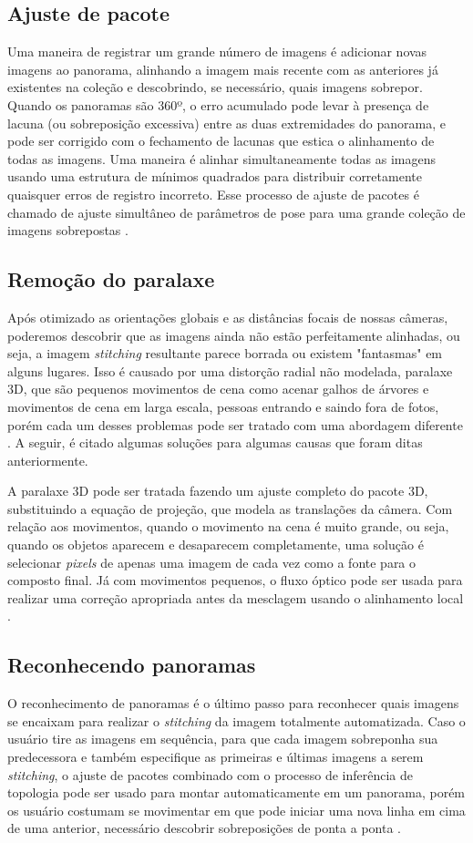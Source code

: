 \documentclass{article}
\begin{document}
\subsection{Ajuste de pacote}
Uma maneira de registrar um grande número de imagens é adicionar novas imagens ao panorama, alinhando a imagem mais recente com as anteriores já existentes na coleção e descobrindo, se necessário, quais imagens sobrepor. Quando os panoramas são 360º, o erro acumulado pode levar à presença de lacuna (ou sobreposição excessiva) entre as duas extremidades do panorama, e pode ser corrigido com o fechamento de lacunas que estica o alinhamento de todas as imagens. Uma maneira é alinhar simultaneamente todas as imagens usando uma estrutura de mínimos quadrados para distribuir corretamente quaisquer erros de registro incorreto. Esse processo de ajuste de pacotes é chamado de ajuste simultâneo de parâmetros de pose para uma grande coleção de imagens sobrepostas \cite{szeliski:2010}. 

\subsection{Remoção do paralaxe}
Após otimizado as orientações globais e as distâncias focais de nossas câmeras, poderemos descobrir que as imagens ainda não estão perfeitamente alinhadas, ou seja, a imagem \textit{stitching} resultante parece borrada ou existem "fantasmas" em alguns lugares. Isso é causado por uma distorção radial não modelada, paralaxe 3D, que são pequenos movimentos de cena como acenar galhos de árvores e movimentos de cena em larga escala, pessoas entrando e saindo fora de fotos, porém cada um desses problemas pode ser tratado com uma abordagem diferente \cite{szeliski:2010}. A seguir, é citado algumas soluções para algumas causas que foram ditas anteriormente.

A paralaxe 3D pode ser tratada fazendo um ajuste completo do pacote 3D, substituindo a equação de projeção, que modela as translações da câmera. Com relação aos movimentos, quando o movimento na cena é muito grande, ou seja, quando os objetos aparecem e desaparecem completamente, uma solução é selecionar \textit{pixels} de apenas uma imagem de cada vez como a fonte para o composto final. Já com movimentos pequenos, o fluxo óptico pode ser usada para realizar uma correção apropriada antes da mesclagem usando o alinhamento local \cite{szeliski:2010}.

\subsection{Reconhecendo panoramas}
O reconhecimento de panoramas é o último passo para reconhecer quais imagens se encaixam para realizar o \textit{stitching} da imagem totalmente automatizada. Caso o usuário tire as imagens em sequência, para que cada imagem sobreponha sua predecessora e também especifique as primeiras e últimas imagens a serem \textit{stitching}, o ajuste de pacotes combinado com o processo de inferência de topologia pode ser usado para montar automaticamente em um panorama, porém os usuário costumam se movimentar em que pode iniciar uma nova linha em cima de uma anterior, necessário descobrir sobreposições de ponta a ponta \cite{szeliski:2010}.
\end{document}
